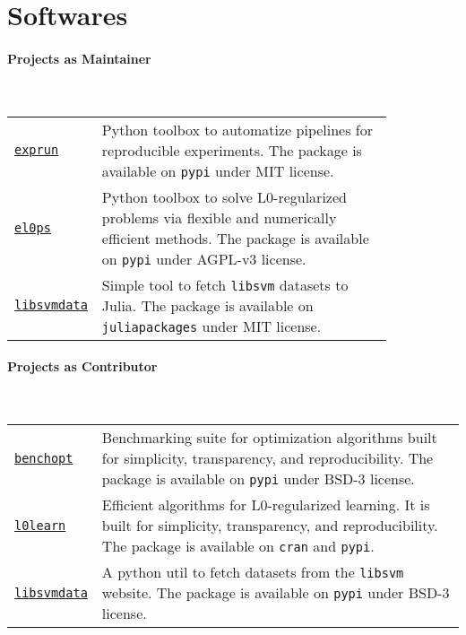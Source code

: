 \section{Softwares}

\paragraph*{Projects as Maintainer}~\\

\begin{longtable}[l]{@{}p{.125\linewidth}p{0.845\linewidth}}
    \href{https://github.com/TheoGuyard/ExpFlow/tree/main}{\texttt{exprun}} & Python toolbox to automatize pipelines for reproducible experiments. The package is available on \texttt{pypi} under MIT license.\\
    \href{https://github.com/TheoGuyard/El0ps/tree/main}{\texttt{el0ps}} & Python toolbox to solve L0-regularized problems via flexible and numerically efficient methods. The package is available on \texttt{pypi} under AGPL-v3 license. \\
    \href{https://github.com/TheoGuyard/LIBSVMdata.jl}{\texttt{libsvmdata}} & Simple tool to fetch \texttt{libsvm} datasets to Julia. The package is available on \texttt{juliapackages} under MIT license.
\end{longtable}

\paragraph*{Projects as Contributor}~\\

\begin{longtable}[l]{@{}p{}p{}}
    \href{https://github.com/benchopt/benchopt}{\texttt{benchopt}} & Benchmarking suite for optimization algorithms built for simplicity, transparency, and reproducibility. The package is available on \texttt{pypi} under BSD-3 license. \\
    \href{https://github.com/hazimehh/L0Learn}{\texttt{l0learn}} & Efficient algorithms for L0-regularized learning. It is built for simplicity, transparency, and reproducibility. The package is available on \texttt{cran} and \texttt{pypi}. \\
    \href{https://github.com/mathurinm/libsvmdata}{\texttt{libsvmdata}} & A python util to fetch datasets from the \texttt{libsvm} website. The package is available on \texttt{pypi} under BSD-3 license. \\
\end{longtable}
